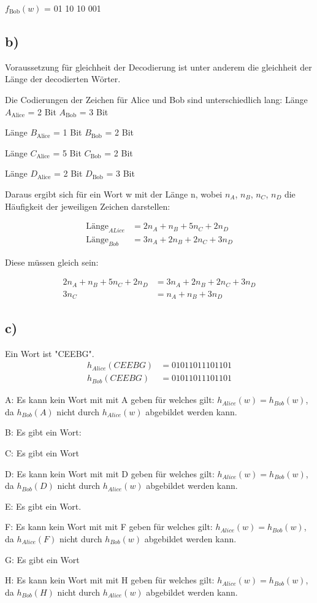 \documentclass{article}
\begin{document}
$f_{\text{Bob}}(w)$ = 01 10 10 001

\subsection*{b)}
Voraussetzung für gleichheit der Decodierung ist unter anderem die gleichheit der Länge der decodierten Wörter.

Die Codierungen der Zeichen für Alice und Bob sind unterschiedlich lang: 
Länge $A_{\text{Alice}}$ = 2 Bit $A_{\text{Bob}}$ = 3 Bit

Länge $B_{\text{Alice}}$ = 1 Bit $B_{\text{Bob}}$ = 2 Bit

Länge $C_{\text{Alice}}$ = 5 Bit $C_{\text{Bob}}$ = 2 Bit

Länge $D_{\text{Alice}}$ = 2 Bit $D_{\text{Bob}}$ = 3 Bit

Daraus ergibt sich für ein Wort w mit der Länge n, wobei $n_{A}$, $n_{B}$, $n_{C}$, $n_{D}$ die Häufigkeit der jeweiligen Zeichen darstellen:

\begin{align*}
	\text{Länge}_{ALice} &= 2n_{A} + n_{B} + 5n_{C} + 2n_{D} \\
	\text{Länge}_{Bob} &= 3n_{A} + 2n_{B} + 2n_{C} + 3n_{D}
\end{align*}

Diese müssen gleich sein:


\begin{align*}
	2n_{A} + n_{B} + 5n_{C} + 2n_{D} &= 3n_{A} + 2n_{B} + 2n_{C} + 3n_{D} \\
	3n_{C}&= n_{A} + n_{B} + 3n_{D}
\end{align*}

\subsection*{c)}

Ein Wort ist "CEEBG".
\begin{align*}
	h_{Alice}(CEEBG) &= 01011011101101 \\
	h_{Bob}(CEEBG) &= 01011011101101
\end{align*}

A: Es kann kein Wort mit mit A geben für welches gilt: $h_{Alice}(w) = h_{Bob}(w)$, da $h_{Bob}(A)$ nicht durch $h_{Alice}(w)$ abgebildet werden kann.

B: Es gibt ein Wort: 

C: Es gibt ein Wort

D: Es kann kein Wort mit mit D geben für welches gilt: $h_{Alice}(w) = h_{Bob}(w)$, da $h_{Bob}(D)$ nicht durch $h_{Alice}(w)$ abgebildet werden kann.

E: Es gibt ein Wort.

F: Es kann kein Wort mit mit F geben für welches gilt: $h_{Alice}(w) = h_{Bob}(w)$, da $h_{Alice}(F)$ nicht durch $h_{Bob}(w)$ abgebildet werden kann.

G: Es gibt ein Wort

H: Es kann kein Wort mit mit H geben für welches gilt: $h_{Alice}(w) = h_{Bob}(w)$, da $h_{Bob}(H)$ nicht durch $h_{Alice}(w)$ abgebildet werden kann.
\end{document}
